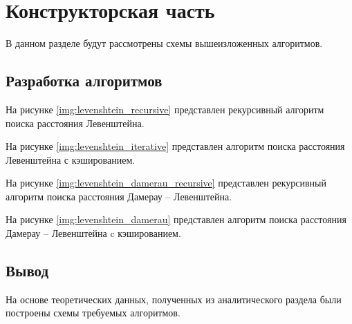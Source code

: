 \chapter{Конструкторская часть}

В данном разделе будут рассмотрены схемы вышеизложенных алгоритмов.

\section{Разработка алгоритмов}

На рисунке \ref{img:levenshtein_recursive} представлен рекурсивный алгоритм поиска расстояния Левенштейна.


\clearpage
На рисунке \ref{img:levenshtein_iterative} представлен алгоритм поиска расстояния Левенштейна с кэшированием.


\clearpage

На рисунке \ref{img:levenshtein_damerau_recursive} представлен рекурсивный алгоритм поиска расстояния Дамерау -- Левенштейна.


\clearpage

На рисунке \ref{img:levenshtein_damerau} представлен алгоритм поиска расстояния Дамерау -- Левенштейна c кэшированием.


\newpage
\section{Вывод}

На основе теоретических данных, полученных из аналитического раздела были построены схемы требуемых алгоритмов.